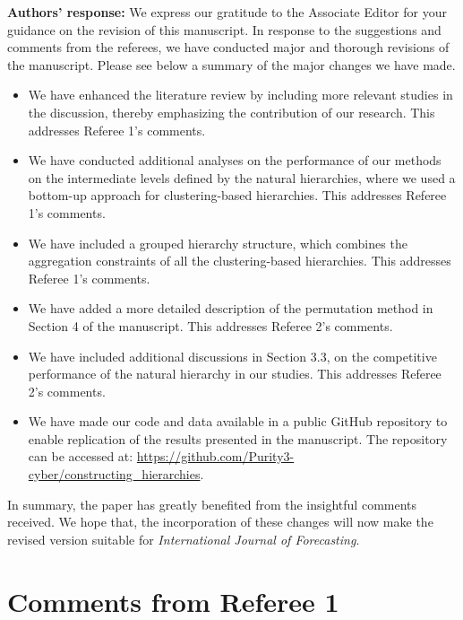 \documentclass{article}
\numberwithin{equation}{section}
\theoremstyle{plain}
\theoremstyle{definition}
\theoremstyle{remark}
\begin{document}
\medskip
\noindent \textbf{Authors' response:}
We express our gratitude to the Associate Editor for your guidance on the revision of this manuscript. In response to the suggestions and comments from the referees, we have conducted major and thorough revisions of the manuscript. Please see below a summary of the major changes we have made. %
\vspace{-0.03in}
\begin{itemize}
    \item We have enhanced the literature review by including more relevant studies in the discussion, thereby emphasizing the contribution of our research. This addresses Referee 1's comments. 
    \item We have conducted additional analyses on the performance of our methods on the intermediate levels defined by the natural hierarchies, where we used a bottom-up approach for clustering-based hierarchies. This addresses Referee 1's comments. 
    
    \item We have included a grouped hierarchy structure, which combines the aggregation constraints of all the clustering-based hierarchies. This addresses Referee 1's comments. 

    \item We have added a more detailed description of the permutation method in Section 4 of the manuscript. This addresses Referee 2's comments.

    \item We have included additional discussions in Section 3.3, on the competitive performance of the natural hierarchy in our studies. This addresses Referee 2's comments.

    \item {We have made our code and data available in a public GitHub repository to enable replication of the results presented in the manuscript. The repository can be accessed at: \url{https://github.com/Purity3-cyber/constructing_hierarchies}.}
    
\end{itemize}


In summary, the paper has greatly benefited from the insightful comments received. We hope that, the incorporation of these changes will now make the revised version suitable for \textit{International Journal of Forecasting}. 

\clearpage 
\newpage 


\section*{Comments from Referee 1}
\end{document}
